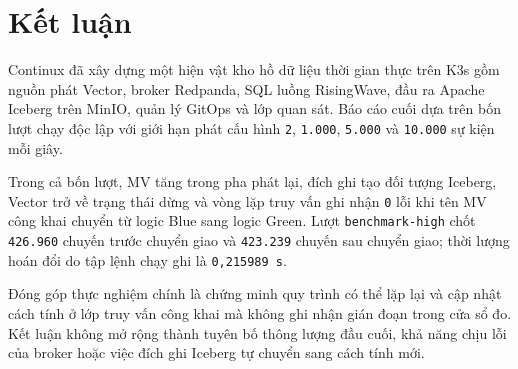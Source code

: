 \section{Kết luận}\label{sec:conclusion}
Continux đã xây dựng một hiện vật kho hồ dữ liệu thời gian thực trên K3s gồm nguồn phát Vector, broker Redpanda, SQL luồng RisingWave, đầu ra Apache Iceberg trên MinIO, quản lý GitOps và lớp quan sát. Báo cáo cuối dựa trên bốn lượt chạy độc lập với giới hạn phát cấu hình \texttt{2}, \texttt{1.000}, \texttt{5.000} và \texttt{10.000} sự kiện mỗi giây.

Trong cả bốn lượt, MV tăng trong pha phát lại, đích ghi tạo đối tượng Iceberg, Vector trở về trạng thái dừng và vòng lặp truy vấn ghi nhận \texttt{0} lỗi khi tên MV công khai chuyển từ logic Blue sang logic Green. Lượt \texttt{benchmark-high} chốt \texttt{426.960} chuyến trước chuyển giao và \texttt{423.239} chuyến sau chuyển giao; thời lượng hoán đổi do tập lệnh chạy ghi là \texttt{0,215989 s}.

Đóng góp thực nghiệm chính là chứng minh quy trình có thể lặp lại và cập nhật cách tính ở lớp truy vấn công khai mà không ghi nhận gián đoạn trong cửa sổ đo. Kết luận không mở rộng thành tuyên bố thông lượng đầu cuối, khả năng chịu lỗi của broker hoặc việc đích ghi Iceberg tự chuyển sang cách tính mới.
